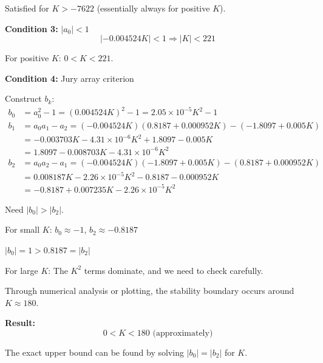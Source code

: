 \begin{example}
Satisfied for $K > -7622$ (essentially always for positive $K$).

\textbf{Condition 3:} $|a_0| < 1$
\begin{equation}
|{-0.004524K}| < 1 \Rightarrow |K| < 221
\end{equation}

For positive $K$: $0 < K < 221$.

\textbf{Condition 4:} Jury array criterion

Construct $b_k$:
\begin{align}
b_0 &= a_0^2 - 1 = (0.004524K)^2 - 1 = 2.05 \times 10^{-5} K^2 - 1 \\
b_1 &= a_0 a_1 - a_2 = (-0.004524K)(0.8187 + 0.000952K) - (-1.8097 + 0.005K) \\
&= -0.003703K - 4.31 \times 10^{-6} K^2 + 1.8097 - 0.005K \\
&= 1.8097 - 0.008703K - 4.31 \times 10^{-6} K^2 \\
b_2 &= a_0 a_2 - a_1 = (-0.004524K)(-1.8097 + 0.005K) - (0.8187 + 0.000952K) \\
&= 0.008187K - 2.26 \times 10^{-5} K^2 - 0.8187 - 0.000952K \\
&= -0.8187 + 0.007235K - 2.26 \times 10^{-5} K^2
\end{align}

Need $|b_0| > |b_2|$.

For small $K$: $b_0 \approx -1$, $b_2 \approx -0.8187$

$|b_0| = 1 > 0.8187 = |b_2|$ \checkmark

For large $K$: The $K^2$ terms dominate, and we need to check carefully.

Through numerical analysis or plotting, the stability boundary occurs around $K \approx 180$.

\textbf{Result:}
\begin{equation}
\boxed{0 < K < 180 \text{ (approximately)}}
\end{equation}

The exact upper bound can be found by solving $|b_0| = |b_2|$ for $K$.
\end{example}

